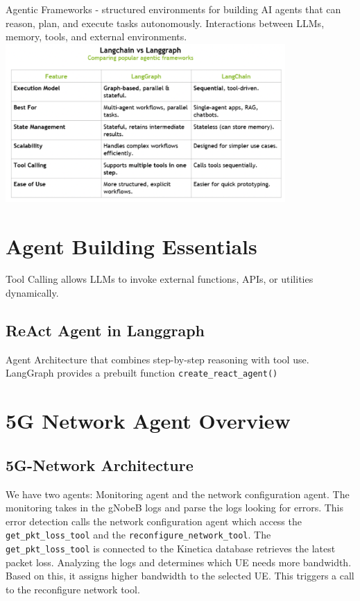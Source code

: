 \documentclass{article}
\begin{document}
Agentic Frameworks - structured environments for building AI agents that can reason, plan, and execute tasks autonomously.  Interactions between LLMs, memory, tools, and external environments. \\\includegraphics[width=0.8\textwidth]{../images/langChainvsgraph.png}\\
\section{Agent Building Essentials}
Tool Calling allows LLMs to invoke external functions, APIs, or utilities dynamically. 

\subsection{ReAct Agent in Langgraph}
Agent Architecture that combines step-by-step reasoning with tool use. LangGraph provides a prebuilt function \verb|create_react_agent()| 
\section{5G Network Agent Overview}
\subsection{5G-Network Architecture}
We have two agents: Monitoring agent and the network configuration agent. The monitoring takes in the gNobeB logs and parse the logs looking for errors. This error detection calls the network configuration agent which access the \verb|get_pkt_loss_tool| and the \verb|reconfigure_network_tool|. The \verb|get_pkt_loss_tool| is connected to the Kinetica database retrieves the latest packet loss. Analyzing the logs and determines which UE needs more bandwidth. Based on this, it assigns higher bandwidth to the selected UE. This triggers a call to the reconfigure network tool. 
\end{document}
